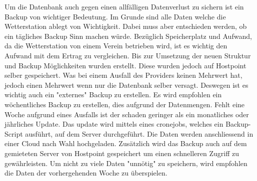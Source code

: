 Um die Datenbank auch gegen einen allfälligen Datenverlust zu sichern ist ein Backup von wichtiger Bedeutung. Im Grunde sind alle Daten welche die Wetterstation ablegt von Wichtigkeit. Dabei muss aber entschieden werden, ob ein tägliches Backup Sinn machen würde. Bezüglich Speicherplatz und Aufwand, da die Wetterstation von einem Verein betrieben wird, ist es wichtig den Aufwand mit dem Ertrag zu vergleichen. Bis zur  Umsetzung der neuen Struktur und Backup Möglichkeiten wurden  erstellt. Diese wurden jedoch auf Hostpoint selber gespeichert. Was bei einem Ausfall des Providers keinen Mehrwert hat, jedoch einen Mehrwert wenn nur die Datenbank selber versagt. Deswegen ist es wichtig auch ein "externes" Backup zu erstellen. Es wird empfohlen ein wöchentliches Backup zu erstellen, dies aufgrund der Datenmengen. Fehlt eine Woche aufgrund eines Ausfalls ist der schaden geringer als ein monatliches oder jährliches Update. Das update wird mittels eines cronejobs, welches ein Backup-Script ausführt, auf dem Server durchgeführt. Die Daten werden anschliessend in einer Cloud nach Wahl hochgeladen. Zusätzlich wird das Backup auch auf dem gemieteten Server von Hostpoint gespeichert um einen schnelleren Zugriff zu gewährleisten. Um nicht zu viele Daten "unnötig" zu speichern, wird empfohlen die Daten der vorhergehenden Woche zu überspielen.    


